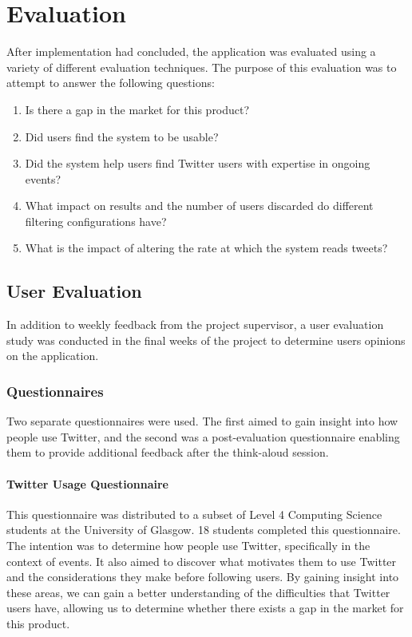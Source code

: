 \documentclass{l4proj}
\begin{document}
        
\chapter{Evaluation}

After implementation had concluded, the application was evaluated using a variety of different evaluation techniques. The purpose of this evaluation was to attempt to answer the following questions:

\begin{enumerate}
\item Is there a gap in the market for this product?
\item Did users find the system to be usable?
\item Did the system help users find Twitter users with expertise in ongoing events?
\item What impact on results and the number of users discarded do different filtering configurations have?
\item What is the impact of altering the rate at which the system reads tweets?
\end{enumerate}


\section{User Evaluation}

    In addition to weekly feedback from the project supervisor, a user evaluation study was conducted in the final weeks of the project to determine users opinions on the application.

    \subsection{Questionnaires}
    Two separate questionnaires were used. The first aimed to gain insight into how people use Twitter, and the second was a post-evaluation questionnaire enabling them to provide additional feedback after the think-aloud session.
    
        \subsubsection{Twitter Usage Questionnaire}
        This questionnaire was distributed to a subset of Level 4 Computing Science students at the University of Glasgow. 18 students completed this questionnaire. The intention was to determine how people use Twitter, specifically in the context of events. It also aimed to discover what motivates them to use Twitter and the considerations they make before following users. By gaining insight into these areas, we can gain a better understanding of the difficulties that Twitter users have, allowing us to determine whether there exists a gap in the market for this product.
\end{document}

